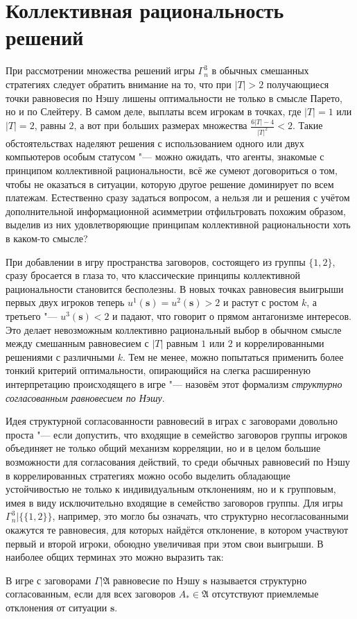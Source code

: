 \section{Коллективная рациональность решений}\label{sec:ch2/sec5}

При рассмотрении множества решений игры $\Gamma^3_n$ в обычных смешанных стратегиях следует обратить внимание на то, что при $\left| T \right| > 2$ получающиеся точки равновесия по Нэшу лишены оптимальности не только в смысле Парето, но и по Слейтеру. В самом деле, выплаты всем игрокам в точках, где $\left| T \right| = 1$ или $\left| T \right| = 2$, равны $2$, а вот при больших размерах множества $\frac{6 \left| T \right| - 4}{\left| T \right|^2} < 2$. Такие обстоятельствах наделяют решения с использованием одного или двух компьютеров особым статусом "--- можно ожидать, что агенты, знакомые с принципом коллективной рациональности, всё же сумеют договориться о том, чтобы не оказаться в ситуации, которую другое решение доминирует по всем платежам. Естественно сразу задаться вопросом, а нельзя ли и решения с учётом дополнительной информационной асимметрии отфильтровать похожим образом, выделив из них удовлетворяющие принципам коллективной рациональности хоть в каком-то смысле?

При добавлении в игру пространства заговоров, состоящего из группы $\{1, 2\}$, сразу бросается в глаза то, что классические принципы коллективной рациональности становится бесполезны. В новых точках равновесия выигрыши первых двух игроков теперь $u^1(\mathbf{s}) = u^2(\mathbf{s}) > 2$ и растут с ростом $k$, а третьего "--- $u^3(\mathbf{s}) < 2$ и падают, что говорит о прямом антагонизме интересов. Это делает невозможным коллективно рациональный выбор в обычном смысле между смешанным равновесием с $\left| T \right|$ равным $1$ или $2$ и коррелированными решениями с различными $k$. Тем не менее, можно попытаться применить более тонкий критерий оптимальности, опирающийся на слегка расширенную интерпретацию происходящего в игре "--- назовём этот формализм \emph{структурно согласованным равновесием по Нэшу}.

Идея структурной согласованности равновесий в играх с заговорами довольно проста "--- если допустить, что входящие в семейство заговоров группы игроков объединяет не только общий механизм корреляции, но и в целом большие возможности для согласования действий, то среди обычных равновесий по Нэшу в коррелированных стратегиях можно особо выделить обладающие устойчивостью не только к индивидуальным отклонениям, но и к групповым, имея в виду исключительно входящие в семейство заговоров группы. Для игры $\Gamma^3_n | \{\{1,2\}\}$, например, это могло бы означать, что структурно несогласованными окажутся те равновесия, для которых найдётся отклонение, в котором участвуют первый и второй игроки, обоюдно увеличивая при этом свои выигрыши. В наиболее общих терминах это можно выразить так:
\begin{definition}
	В игре с заговорами $\Gamma | \mathfrak{A}$ равновесие по Нэшу $\mathbf{s}$ называется структурно согласованным, если для всех заговоров $A_* \in \mathfrak{A}$ отсутствуют приемлемые отклонения от ситуации $\mathbf{s}$.
\end{definition}

